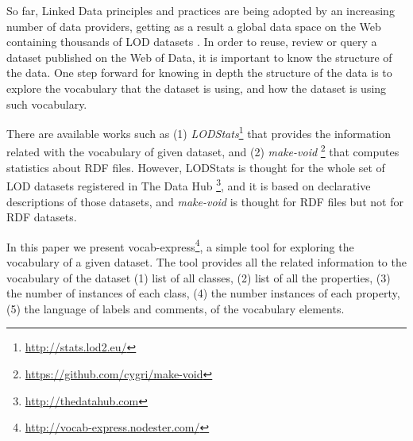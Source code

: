 So far, Linked Data principles and practices are being adopted by an increasing number of data providers, getting as a result a global data space on the Web containing thousands of LOD datasets \cite{Heath_Bizer_2011}. In order to reuse, review or query a dataset published on the Web of Data, it is important to know the structure of the data. One step forward for knowing in depth the structure of the data is to explore the vocabulary that the dataset is using, and how the dataset is using such vocabulary.

There are available works such as (1) \emph{LODStats}\footnote{\footnotesize \url{http://stats.lod2.eu/}} that provides the information related with the vocabulary of given dataset, and (2) \emph{make-void} \footnote{\footnotesize \url{https://github.com/cygri/make-void}} that computes statistics about RDF files. However, LODStats is thought for the whole set of LOD datasets registered in The Data Hub \footnote{\footnotesize \url{http://thedatahub.com}}, and it is based on declarative descriptions of those datasets, and \emph{make-void} is thought for RDF files but not for RDF datasets.

In this paper we present vocab-express\footnote{\footnotesize \url{http://vocab-express.nodester.com/}}, a simple tool for exploring the vocabulary of a given dataset. The tool provides all the related information to the vocabulary of the dataset (1) list of all classes, (2) list of all the properties, (3) the number of instances of each class, (4) the number instances of each property, (5) the language of labels and comments, of the vocabulary elements.


